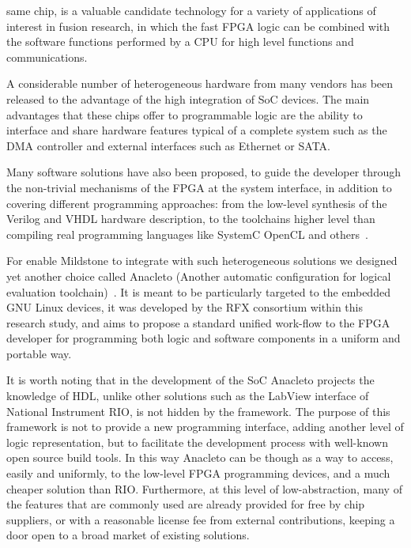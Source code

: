 same chip, is a valuable candidate technology for a variety of applications of interest in fusion research, in which the fast FPGA logic can be combined with the software functions performed by a CPU for high level functions and communications.

A considerable number of heterogeneous hardware from many vendors has been released to the advantage of the high integration of SoC devices. The main advantages that these chips offer to programmable logic are the ability to interface and share hardware features typical of a complete system such as the DMA controller and external interfaces such as Ethernet or SATA.

Many software solutions have also been proposed, to guide the developer through the non-trivial mechanisms of the FPGA at the system interface, in addition to covering different programming approaches: from the low-level synthesis of the Verilog and VHDL hardware description, to the toolchains higher level than compiling real programming languages like SystemC OpenCL and others~\cite{ana_7,ana_8}.

For enable Mildstone to integrate with such heterogeneous solutions we designed yet another choice called Anacleto (Another automatic configuration for logical evaluation toolchain)~\cite{RIGONI2018122}. It is meant to be particularly targeted to the embedded GNU Linux devices, it was developed by the RFX consortium within this research study, and aims to propose a standard unified work-flow to the FPGA developer for programming both logic and software components in a uniform and portable way.

It is worth noting that in the development of the SoC Anacleto projects the knowledge of HDL, unlike other solutions such as the LabView interface of National Instrument RIO, is not hidden by the framework. The purpose of this framework is not to provide a new programming interface, adding another level of logic representation, but to facilitate the development process with well-known open source build tools. In this way Anacleto can be though as a way to access, easily and uniformly, to the low-level FPGA programming devices, and a much cheaper solution than RIO. Furthermore, at this level of low-abstraction, many of the features that are commonly used are already provided for free by chip suppliers, or with a reasonable license fee from external contributions, keeping a door open to a broad market of existing solutions.

